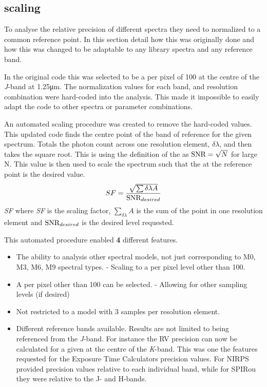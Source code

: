 {\subsection{\snr{} scaling}
\label{subsec:snr_scaling}
To analyse the relative precision of different spectra they need to normalized to a common reference point.
In this section  detail how this was originally done and how this was changed to be adaptable to any library spectra and any reference band.

In the original code this was selected to be a \snr{} per pixel of 100 at the centre of the \textit{J}-band at 1.25\si{\micro\meter}.
The normalization values for each band, \Vsini{} and resolution combination were hard-coded into the analysis.
This made it impossible to easily adapt the code to other spectra or parameter combinations.

An automated \snr{} scaling procedure was created to remove the hard-coded values.
This updated code finds the centre point of the band of reference for the given spectrum.
Totals the photon count across one resolution element, \(\delta\lambda\), and then takes the square root.
This is using the definition of the \snr{} as \(\textrm{SNR}{} = \sqrt{N}\) for large N.
This value is then used to scale the spectrum such that the \snr{} at the reference point is the desired value.
\begin{equation}
    SF =  \frac{\sqrt{\sum{\delta\lambda} A}} {\textrm{SNR}{}_{desired}}
\end{equation}
\textit{SF} where \textit{SF} is the scaling factor, \(\sum_{\delta\lambda} A\) is the sum of the point in one resolution element and \({\textrm{SNR}{}}_{desired}\) is the desired \snr{} level requested.

This automated procedure enabled {\red{}\textbf{4}} different features.
\begin{itemize}
    \setlength\itemsep{-0.3em} %
    \item The ability to analysis other spectral models, not just corresponding to {M0}, {M3}, {M6}, {M9} spectral types.
    - Scaling to a \snr{} per pixel level other than 100.
    \item A \snr{} per pixel other than 100 can be selected.
    - Allowing for other sampling levels (if desired)
    \item Not restricted to a model with 3 samples per resolution element.
    \item Different reference bands available.
    Results are not limited to being referenced from the \textit{J}-band.
    For instance the {RV} precision can now be calculated for a given \snr{} at the centre of the \textit{K}-band.
    This was one the features requested for the Exposure Time Calculators precision values.
    For {NIRPS}  provided precision values relative to each individual band, while for {SPIRou} they were relative to the {J}- and {H}-bands.
\end{itemize}

}
